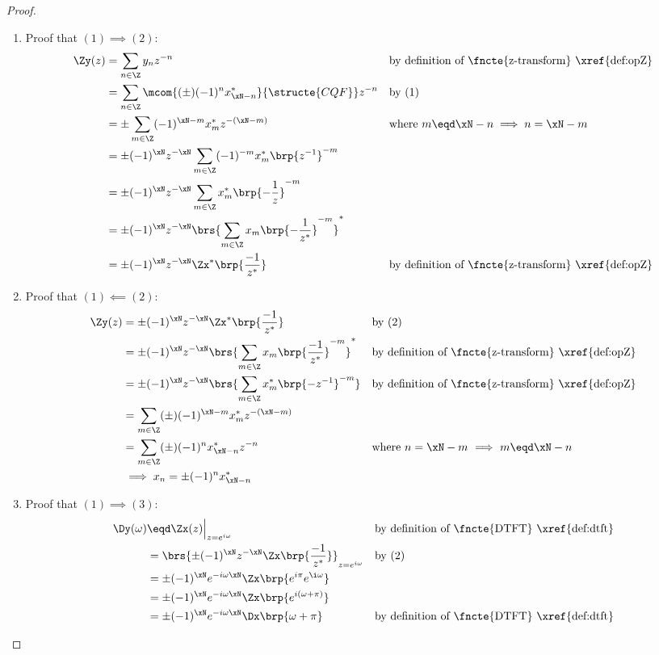 \begin{proof}
\begin{enumerate}
  \item Proof that $(1)\implies(2)$:
    \begin{align*}
      \Zy(z)
        &= \sum_{n\in\Z}  y_{n}  z^{-n}
        && \text{by definition of \fncte{z-transform} \xref{def:opZ}}
      \\&= \sum_{n\in\Z} \mcom{(\pm) (-1)^n x^\ast_{\xN-n}}{\structe{CQF}} z^{-n}
        && \text{by (1)}
      \\&= \pm\sum_{m\in\Z} (-1)^{\xN-m} x_m^\ast z^{-(\xN-m)}
        && \text{where } m\eqd\xN-n \implies n=\xN-m
      \\&= \pm (-1)^\xN z^{-\xN}
           \sum_{m\in\Z}(-1)^{-m} x_m^\ast \brp{z^{-1}}^{-m}
      \\&= \pm (-1)^\xN z^{-\xN}
           \sum_{m\in\Z} x^\ast_m \brp{-\frac{1}{z}}^{-m}
      \\&= \pm (-1)^\xN z^{-\xN}
           \brs{\sum_{m\in\Z} x_m \brp{-\frac{1}{z^\ast}}^{-m}}^\ast
      \\&= \pm (-1)^\xN z^{-\xN}\Zx^\ast\brp{\frac{-1}{z^\ast}}
        && \text{by definition of \fncte{z-transform} \xref{def:opZ}}
    \end{align*}

  \item Proof that $(1)\impliedby(2)$:
    \begin{align*}
      \Zy(z)
        &= \pm (-1)^\xN z^{-\xN} \Zx^\ast\brp{\frac{-1}{z^\ast}}
        && \text{by (2)}
      \\&= \pm (-1)^\xN z^{-\xN} \brs{\sum_{m\in\Z} x_m \brp{\frac{-1}{z^\ast}}^{-m}}^\ast
        && \text{by definition of \fncte{z-transform} \xref{def:opZ}}
      \\&= \pm (-1)^\xN z^{-\xN} \brs{\sum_{m\in\Z} x^\ast_m \brp{-z^{-1}}^{-m}}
        && \text{by definition of \fncte{z-transform} \xref{def:opZ}}
      \\&= \sum_{m\in\Z}(\pm) (-1)^{\xN-m} x^\ast_m z^{-(\xN-m)}
      \\&= \sum_{m\in\Z}(\pm) (-1)^{n} x^\ast_{\xN-n} z^{-n}
        && \text{where $n=\xN-m$ $\implies$ $m\eqd\xN-n$}
      \\&\implies x_n = \pm (-1)^n x^\ast_{\xN-n}
    \end{align*}

  \item Proof that $(1)\implies(3)$:
    \begin{align*}
      \Dy(\omega)
        &\eqd \Zx(z)\Big|_{z=e^{i\omega}}
        &&    \text{by definition of \fncte{DTFT} \xref{def:dtft}}
      \\&=    \brs{\pm (-1)^\xN z^{-\xN}\Zx\brp{\frac{-1}{z^\ast}}}_{z=e^{i\omega}}
        &&    \text{by (2)}
      \\&=    \pm (-1)^\xN e^{-i\omega\xN}\Zx\brp{e^{i\pi}e^{\i\omega}}
      \\&=    \pm (-1)^\xN e^{-i\omega\xN}\Zx\brp{e^{i(\omega+\pi)}}
      \\&=    \pm (-1)^\xN e^{-i\omega\xN}\Dx\brp{\omega+\pi}
        &&    \text{by definition of \fncte{DTFT} \xref{def:dtft}}
    \end{align*}


\end{enumerate}
\end{proof}
